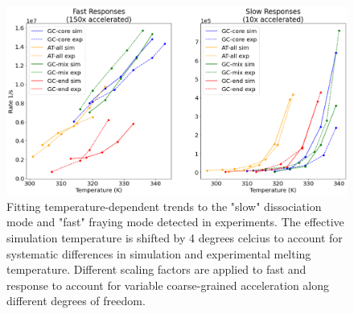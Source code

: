 \documentclass[journal=jpcbfk,manuscript=article]{achemso}
\begin{document}


\begin{figure}  %
	\begin{center}
        \includegraphics[width=\textwidth]{Fig2.pdf}
        \caption{Fitting temperature-dependent trends to the "slow" dissociation mode and "fast" fraying mode detected in experiments. The effective simulation temperature is shifted by 4 degrees celcius to account for systematic differences in simulation and experimental melting temperature. Different scaling factors are applied to fast and response to account for variable coarse-grained acceleration along different degrees of freedom.}
        \label{fig:relaxation-comparison}
	\end{center}
\end{figure}

\end{document}
